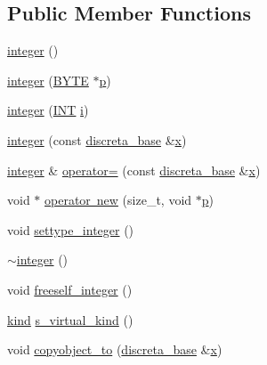 \subsection*{Public Member Functions}
\begin{DoxyCompactItemize}
\item 
\mbox{\hyperlink{classinteger_a48a0c2e70d6c116c058e19c4cb546aed}{integer}} ()
\item 
\mbox{\hyperlink{classinteger_a2d9b863abf3f285182954a852cd6c629}{integer}} (\mbox{\hyperlink{galois_8h_ab6cc7b4aeb6ea31aba2b3fbfc83ff5e6}{B\+Y\+TE}} $\ast$\mbox{\hyperlink{alphabet2_8_c_a533391314665d6bf1b5575e9a9cd8552}{p}})
\item 
\mbox{\hyperlink{classinteger_a94fbe85c84fa9a8b9ccad5948f94f780}{integer}} (\mbox{\hyperlink{galois_8h_a09fddde158a3a20bd2dcadb609de11dc}{I\+NT}} \mbox{\hyperlink{alphabet2_8_c_acb559820d9ca11295b4500f179ef6392}{i}})
\item 
\mbox{\hyperlink{classinteger_a37270fa45383a0798e3fd1e1330cb9a5}{integer}} (const \mbox{\hyperlink{classdiscreta__base}{discreta\+\_\+base}} \&\mbox{\hyperlink{alphabet2_8_c_a6150e0515f7202e2fb518f7206ed97dc}{x}})
\item 
\mbox{\hyperlink{classinteger}{integer}} \& \mbox{\hyperlink{classinteger_a52f72e5f2da0f1617355e03a7202492f}{operator=}} (const \mbox{\hyperlink{classdiscreta__base}{discreta\+\_\+base}} \&\mbox{\hyperlink{alphabet2_8_c_a6150e0515f7202e2fb518f7206ed97dc}{x}})
\item 
void $\ast$ \mbox{\hyperlink{classinteger_ab23c39901803e33fb3b52be1476ec54a}{operator new}} (size\+\_\+t, void $\ast$\mbox{\hyperlink{alphabet2_8_c_a533391314665d6bf1b5575e9a9cd8552}{p}})
\item 
void \mbox{\hyperlink{classinteger_a6265c65ef311229acd513d748faba796}{settype\+\_\+integer}} ()
\item 
\mbox{\hyperlink{classinteger_a87b9f2b5aaf4ab5e5230b33d456e33d5}{$\sim$integer}} ()
\item 
void \mbox{\hyperlink{classinteger_a02eb557612c9db1820dd75a77151edc0}{freeself\+\_\+integer}} ()
\item 
\mbox{\hyperlink{discreta_8h_aaf25ee7e2306d78c74ec7bc48f092e81}{kind}} \mbox{\hyperlink{classinteger_a183985f67ef55beed80bda05a0c574d9}{s\+\_\+virtual\+\_\+kind}} ()
\item 
void \mbox{\hyperlink{classinteger_a0258f5ab80826ddd4d845a52a6c450b2}{copyobject\+\_\+to}} (\mbox{\hyperlink{classdiscreta__base}{discreta\+\_\+base}} \&\mbox{\hyperlink{alphabet2_8_c_a6150e0515f7202e2fb518f7206ed97dc}{x}})

\end{DoxyCompactItemize}
